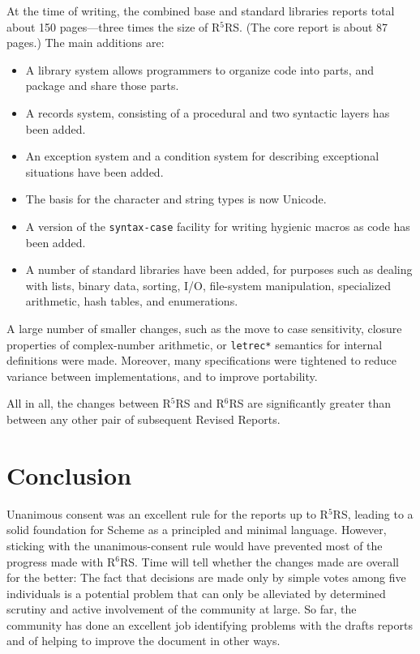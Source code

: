 \documentclass{sigplanconf}
\newcommand{\rn}[1]{R$^{#1}$RS}
\begin{document}
At the time of writing, the combined base and standard
libraries reports total about 150 pages---three times the size
of \rn{5}.  (The core report is about 87 pages.)  The main additions
are:
%
\begin{itemize}
\item A library system allows programmers to organize code into parts,
  and package and share those parts.
\item A records system, consisting of a procedural and two syntactic
  layers has been added.
\item An exception system and a condition system for describing
  exceptional situations have been added.
\item The basis for the character and string types is now Unicode.
\item A version of the \texttt{syntax-case} facility for writing
  hygienic macros as code has been added.
\item A number of standard libraries have been added, for purposes
  such as dealing with lists, binary data, sorting, I/O, file-system
  manipulation, specialized arithmetic, hash tables, and enumerations.
\end{itemize}
%
A large number of smaller changes, such as the move to case
sensitivity, closure properties of complex-number arithmetic, or
\texttt{letrec*} semantics for internal definitions were made.
Moreover, many specifications were tightened to reduce variance
between implementations, and to improve portability.

All in all, the changes between \rn{5} and \rn{6} are significantly
greater than between any other pair of subsequent Revised
Reports.

\section{Conclusion}
\label{sec:conclusion}

Unanimous consent was an excellent rule for the reports up to \rn{5},
leading to a solid foundation for Scheme as a principled and minimal
language.  However, sticking with the unanimous-consent rule would
have prevented most of the progress made with \rn{6}.  Time will tell
whether the changes made are overall for the better: The fact that
decisions are made only by simple votes among five individuals is a
potential problem that can only be alleviated by determined scrutiny
and active involvement of the community at large.  So far, the
community has done an excellent job identifying problems with the
drafts reports and of helping to improve the document in other ways.
\end{document}
